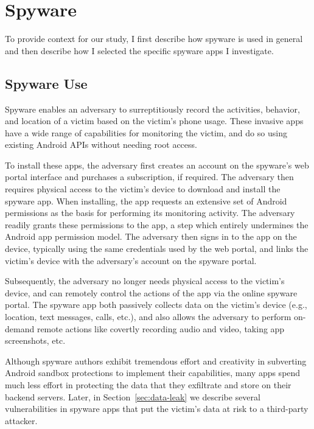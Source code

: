

\section{Spyware}

To provide context for our study, I first describe how spyware is
used in general and then describe how I selected the specific spyware
apps I investigate.

\subsection{Spyware Use}

Spyware enables an adversary to surreptitiously record the activities,
behavior, and location of a victim based on the victim's phone usage.
These invasive apps have a wide range of capabilities for
monitoring the victim, and do so using existing Android APIs without
needing root access.

To install these apps, the adversary first creates an account on the spyware's web portal
interface and purchases a subscription, if required.  The adversary then
requires physical access to the victim's device to download and
install the spyware app.  When installing, the app requests an
extensive set of Android permissions as the basis for performing its
monitoring activity.  The adversary readily grants these permissions to
the app, a step which entirely undermines the Android app permission
model.  The adversary then signs in to the app on the device, typically
using the same credentials used by the web portal, and links the
victim's device with the adversary's account on the spyware portal.

Subsequently, the adversary no longer needs physical access to the victim's device, and
can remotely control the actions of the app via the online spyware portal.
The spyware app both passively collects data on the victim's device (e.g.,
location, text messages, calls, etc.), and also allows the adversary to
perform on-demand remote actions like covertly recording audio and
video, taking app screenshots, etc.

Although spyware authors exhibit tremendous effort and creativity in subverting
Android sandbox protections to implement their capabilities, many apps spend
much less effort in protecting the data that they exfiltrate and store on
their backend servers. Later, in Section~\ref{sec:data-leak} we
describe several vulnerabilities in spyware apps that put the victim's
data at risk to a third-party attacker.



